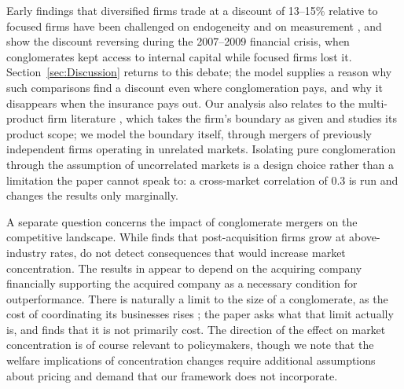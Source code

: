 \documentclass[12pt,a4paper]{article}
\begin{document}
Early findings that diversified firms trade at a discount of 13--15\% relative to focused firms \parencite{lang1994tobins, berger1995diversification} have been challenged on endogeneity \parencite{campa2002explaining} and on measurement \parencite{villalonga2004diversification}, and \textcite{kuppuswamy2016does} show the discount reversing during the 2007--2009 financial crisis, when conglomerates kept access to internal capital while focused firms lost it. Section~\ref{sec:Discussion} returns to this debate; the model supplies a reason why such comparisons find a discount even where conglomeration pays, and why it disappears when the insurance pays out. Our analysis also relates to the multi-product firm literature \parencite{bernard2010multiple, nocke2014globalization}, which takes the firm's boundary as given and studies its product scope; we model the boundary itself, through mergers of previously independent firms operating in unrelated markets. Isolating pure conglomeration through the assumption of uncorrelated markets is a design choice rather than a limitation the paper cannot speak to: a cross-market correlation of 0.3 is run and changes the results only marginally. 

A separate question concerns the impact of conglomerate mergers on the competitive landscape. While \textcite{waldman1983impact} finds that post-acquisition firms grow at above-industry rates, \textcites{goldberg1973effect}{goldberg1974conglomerate} do not detect consequences that would increase market concentration. The results in \textcite{waldman1983impact} appear to depend on the acquiring company financially supporting the acquired company as a necessary condition for outperformance. There is naturally a limit to the size of a conglomerate, as the cost of coordinating its businesses rises \parencite{coase19883}; the paper asks what that limit actually is, and finds that it is not primarily cost. The direction of the effect on market concentration is of course relevant to policymakers, though we note that the welfare implications of concentration changes require additional assumptions about pricing and demand that our framework does not incorporate. 
\end{document}
